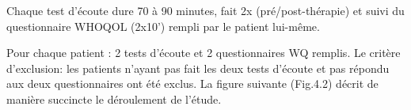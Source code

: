 Chaque test d'écoute dure
70 à 90 minutes, fait 2x (pré/post-thérapie) et
suivi du questionnaire WHOQOL (2x10') rempli par le
patient lui-même.

Pour chaque patient : 2 tests d'écoute et 2 
questionnaires WQ 
remplis. Le critère d'exclusion: les patients n'ayant pas fait les deux tests d'écoute et pas répondu aux 
deux 
questionnaires ont été exclus.
La  figure suivante (Fig.4.2) décrit de manière succincte le déroulement de
l'étude. 

 \clearpage












 
